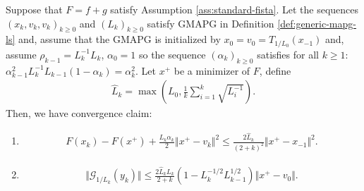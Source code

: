 \documentclass[12pt]{report}
\begin{document}
        \begin{theorem}\label{thm:gmapg-specialized-convergence}
            Suppose that $F = f + g$ satisfy Assumption \ref{ass:standard-fista}. 
            Let the sequences $(x_k, v_k, v_k)_{k \ge 0}$ and $(L_k)_{k \ge 0}$ satisfy GMAPG in Definition \ref{def:generic-mapg-ls} and, assume that the GMAPG is initialized by $x_0 = v_0 = T_{1/L_0}(x_{-1})$ and, assume $\rho_{k - 1} = L_{k}^{-1}L_{k}$, $\alpha_0 = 1$ so the sequence $(\alpha_k)_{k \ge 0}$ satisfies for all $k\ge 1$: $\alpha_{k - 1}^2L_k^{-1}L_{k - 1}(1 - \alpha_k) = \alpha_k^2$. 
            Let $x^+$ be a minimizer of $F$, define 
            \begin{align*}
                \hat L_k = \max\left(
                    L_0, \frac{1}{k}\sum_{i = 1}^{k} \sqrt{L_i^{-1}}
                \right). 
            \end{align*}
            Then, we have convergence claim: 
            \begin{enumerate}
                \item \begin{align*}
                    F(x_k) - F(x^+) + \frac{L_k\alpha_k}{2}\Vert x^+ - v_k\Vert^2 \le 
                    \frac{2\hat L_k}{(2 + k)^2}\Vert x^+ - x_{-1}\Vert^2.
                \end{align*}
                \item 
                \begin{align*}
                    \Vert \mathcal G_{1/L_k}(y_k)\Vert \le 
                    \frac{2\hat L_k L_k}{2 + k}
                    \left(
                        1 - L_k^{-1/2}L_{k - 1}^{1/2}
                    \right)
                    \Vert x^+ - v_0\Vert. 
                \end{align*}
            \end{enumerate}
        \end{theorem}
\end{document}
